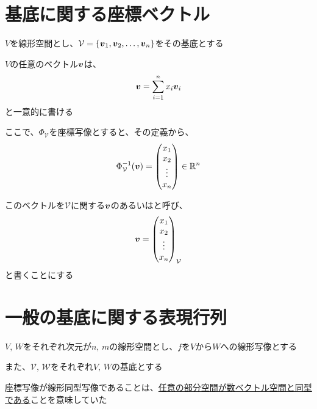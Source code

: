 \documentclass[../../../topic_linear-algebra]{subfiles}
\begin{document}
\sectionline
\section{基底に関する座標ベクトル}

$V$を線形空間とし、$\mathcal{V} = \{\vb*{v}_1, \vb*{v}_2, \ldots, \vb*{v}_n\}$をその基底とする

$V$の任意のベクトル$\vb*{v}$は、
\begin{equation*}
  \vb*{v} = \sum_{i=1}^n x_i \vb*{v}_i
\end{equation*}
と一意的に書ける

\br

ここで、$\Phi_\mathcal{V}$を座標写像とすると、その定義から、
\begin{equation*}
  \Phi^{-1}_\mathcal{V}(\vb*{v}) = \begin{pmatrix}
    x_1    \\
    x_2    \\
    \vdots \\
    x_n
  \end{pmatrix}
  \in \mathbb{R}^n
\end{equation*}

このベクトルを$\mathcal{V}$に関する$\vb*{v}$のあるいはと呼び、
\begin{equation*}
  \vb*{v} = \begin{pmatrix}
    x_1    \\
    x_2    \\
    \vdots \\
    x_n
  \end{pmatrix}_{\mathcal{V}}
\end{equation*}
と書くことにする

\sectionline
\section{一般の基底に関する表現行列}

$V,\,W$をそれぞれ次元が$n,\,m$の線形空間とし、$f$を$V$から$W$への線形写像とする

また、$\mathcal{V}, \, \mathcal{W}$をそれぞれ$V,\,W$の基底とする

\br

座標写像が線形同型写像であることは、\hyperref[thm:subspace-isomorphic-to-Kn]{任意の部分空間が数ベクトル空間と同型である}ことを意味していた
\end{document}
